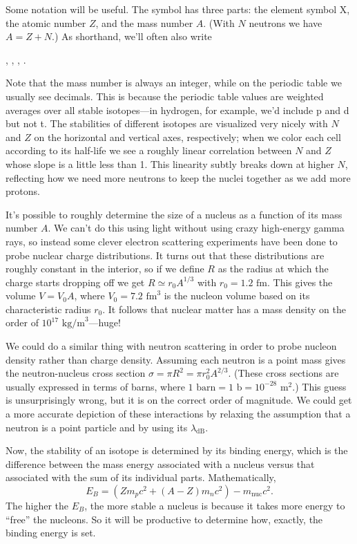 \documentclass[../p052main.tex]{subfiles}
\begin{document}
Some notation will be useful.
The symbol  has three parts: the element symbol X, the atomic number $Z$, and the mass number $A$.
(With $N$ neutrons we have $A = Z + N$.)
As shorthand, we'll often also write
\begin{center}
    , \quad {}, \quad {}, \quad {}.
\end{center}
Note that the mass number is always an integer, while on the periodic table we usually see decimals.
This is because the periodic table values are weighted averages over all stable isotopes---in hydrogen, for example, we'd include p and d but not t.
The stabilities of different isotopes are visualized very nicely with $N$ and $Z$ on the horizontal and vertical axes, respectively; when we color each cell according to its half-life we see a roughly linear correlation between $N$ and $Z$ whose slope is a little less than 1.
This linearity subtly breaks down at higher $N$, reflecting how we need more neutrons to keep the nuclei together as we add more protons.

It's possible to roughly determine the size of a nucleus as a function of its mass number $A$.
We can't do this using light without using crazy high-energy gamma rays, so instead some clever electron scattering experiments have been done to probe nuclear charge distributions.
It turns out that these distributions are roughly constant in the interior, so if we define $R$ as the radius at which the charge starts dropping off we get $R \simeq r_0 A^{1 / 3}$ with $r_0 = 1.2 \textrm{ fm}$.
This gives the volume $V = V_0 A$, where $V_0 = 7.2 \textrm{ fm}^3$ is the nucleon volume based on its characteristic radius $r_0$.
It follows that nuclear matter has a mass density on the order of $10^{17} \textrm{ kg/m}^3$---huge!

We could do a similar thing with neutron scattering in order to probe nucleon density rather than charge density.
Assuming each neutron is a point mass gives the neutron-nucleus cross section $\sigma = \pi R^2 = \pi r_0^2 A^{2 / 3}$.
(These cross sections are usually expressed in terms of barns, where $1 \textrm{ barn} = 1 \textrm{ b} = 10^{-28} \textrm{ m}^2$.)
This guess is unsurprisingly wrong, but it is on the correct order of magnitude.
We could get a more accurate depiction of these interactions by relaxing the assumption that a neutron is a point particle and by using its $\lambda_\textrm{dB}$.

Now, the stability of an isotope is determined by its binding energy, which is the difference between the mass energy associated with a nucleus versus that associated with the sum of its individual parts.
Mathematically,
\[ E_B = \left( Z m_p c^2 + (A - Z) m_n c^2 \right) - m_\textrm{nuc} c^2. \]
The higher the $E_B$, the more stable a nucleus is because it takes more energy to ``free'' the nucleons.
So it will be productive to determine how, exactly, the binding energy is set.
\end{document}
